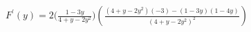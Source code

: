 $ \displaystyle F^{\prime}(y) = 2\bigg(   \frac{1 - 3y}{4 + y - 2y^2}   \bigg) \left(\frac{(4 + y - 2y^2)(-3) - (1-3y)(1 - 4y)}{(4 + y - 2y^2)^2} \right) $